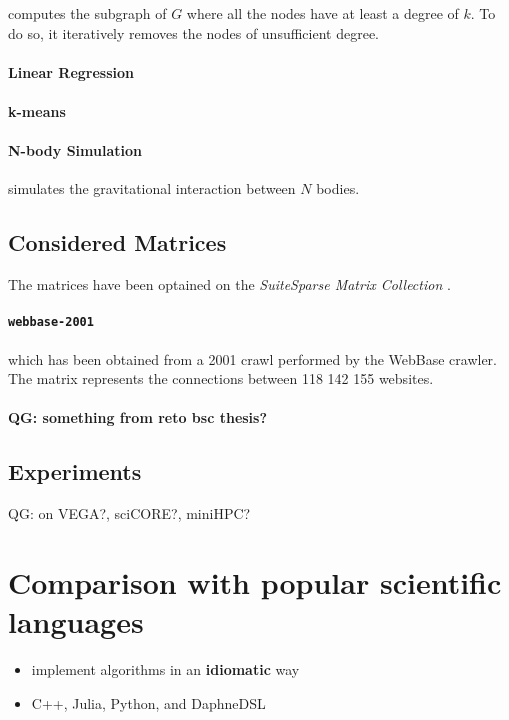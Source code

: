 \documentclass[conference,10pt,a4paper]{IEEEtran}
\newcommand{\qg}[1]{{\color{blue} QG: #1}} %
\begin{document}
computes the subgraph of $G$ where all the nodes have at least a degree of $k$.
To do so, it iteratively removes the nodes of unsufficient degree.

\paragraph{Linear Regression}

\paragraph{k-means}

\paragraph{N-body Simulation}

simulates the gravitational interaction between $N$ bodies.

\subsection{Considered Matrices}

The matrices have been optained on the \textit{SuiteSparse Matrix Collection} \cite{davis2011university}. 

\paragraph{\texttt{webbase-2001} \cite{BoVWFI, BRSLLP}}
which has been obtained from a 2001 crawl performed by the WebBase crawler.
The matrix represents the connections between 118 142 155 websites.


\paragraph{\qg{something from reto bsc thesis?}}

\subsection{Experiments}

\qg{on VEGA?, sciCORE?, miniHPC?}

\section{Comparison with popular scientific languages}

\begin{itemize}
    \item implement algorithms in an \textbf{idiomatic} way
    \item C++, Julia, Python, and DaphneDSL
\end{itemize}
\end{document}
